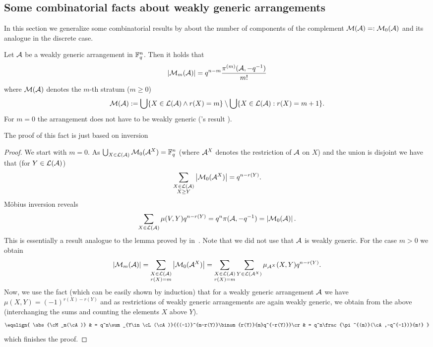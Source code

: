 
\subsection{Some combinatorial facts about weakly generic arrangements}

In this section we generalize some combinatorial results by  about the number of components of the complement $\mathcal{M}(\mathcal{A})=:\mathcal{M}_0(\mathcal{A})$ and its analogue in the discrete case.

\begin{lemma}
    Let $\mathcal{A}$ be a weakly generic arrangement in $\mathbb{F}_{q}^n$. Then it holds that
    $$
        \left|\mathcal{M}_m(\mathcal{A})\right|= q^{n-m}\frac{\pi^{(m)}(\mathcal{A},-q^{-1})}{m!}
    $$
    where $\mathcal{M}(\mathcal{A})$ denotes the $m$-th stratum ($m\geq 0$)
    $$        \mathcal{M}(\mathcal{A}):=\bigcup\{X\in\mathcal{L}(\mathcal{A})\wedge r(X)=m\}\setminus\bigcup\{X\in\mathcal{L}(\mathcal{A}):r(X)=m+1\}\text{.}
    $$
    For $m=0$ the arrangement does not have to be weakly generic ('s result \cite{zas}).
\end{lemma}

The proof of this fact is just based on  inversion

\begin{proof}
    We start with $m=0$.
    As $\bigcup_{X\in\mathcal{L}(\mathcal{A})}{\mathcal{M}_0(\mathcal{A}^X)}=\mathbb{F}_{q}^n$ (where $\mathcal{A}^X$ denotes the restriction of $\mathcal{A}$ on $X$) and the union is disjoint we have that (for $Y\in\mathcal{L}(\mathcal{A})$)
  $$
      \sum_{\substack{X\in\mathcal{L}(\mathcal{A})\\ X\geq Y}}{\left|\mathcal{M}_0(\mathcal{A}^X)\right|}=q^{n-r(Y)}\text{.}
  $$
  Möbius inversion reveals
  $$
      \sum_{X\in\mathcal{L}(\mathcal{A})}{\mu(V,Y)q^{n-r(Y)}} = q^n\pi(\mathcal{A},-q^{-1}) = \left|\mathcal{M}_0(\mathcal{A})\right|\text{.}
  $$
  This is essentially a result analogue to the lemma proved by  in~\cite{zas}. Note that we did not use that $\mathcal{A}$ is weakly generic.
  For the case $m>0$ we obtain
  $$
      \left|\mathcal{M}_m(\mathcal{A})\right|=\sum_{\substack{X\in\mathcal{L}(\mathcal{A})\\ r(X)=m}}{\left|\mathcal{M}_0(\mathcal{A}^X)\right|}=\sum_{\substack{X\in\mathcal{L}(\mathcal{A})\\ r(X)=m}}{\sum_{Y\in\mathcal{L}(\mathcal{A}^X)}{\mu_{\mathcal{A}^X}(X,Y)q^{n-r(Y)}}}\text{.}
  $$
  Now, we use the fact (which can be easily shown by induction) that for a weakly generic arrangement $\mathcal{A}$ we have $\mu(X,Y)={(-1)}^{r(X)-r(Y)}$ and as restrictions of weakly generic arrangements are again weakly generic, we obtain from the above (interchanging the sums and counting the elements $X$ above $Y$).
  $$\eqalign{
      \abs{\cM_m(\cA)}
      & = q^n\sum_{Y\in\cL(\cA)}{{(-1)}^{m-r(Y)}\binom{r(Y)}{m}q^{-r(Y)}}\cr
      & = q^n\frac{\pi^{(m)}(\cA,-q^{-1})}{m!}
  }
  $$
  which finishes the proof.
\end{proof}

